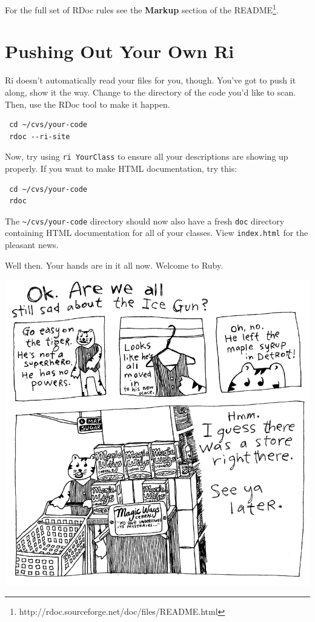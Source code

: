 \documentclass[10pt,twoside]{report}
\begin{document}
For the full set of RDoc rules see the \textbf{Markup} section of the
README\footnote{http://rdoc.sourceforge.net/doc/files/README.html}.

\section{Pushing Out Your Own Ri}

Ri doesn't automatically read your files for you, though. You've got
to push it along, show it the way. Change to the directory of the code
you'd like to scan. Then, use the RDoc tool to make it happen.

\begin{lstlisting}
 cd ~/cvs/your-code
 rdoc --ri-site
\end{lstlisting}

Now, try using \lstinline[breaklines=false]|ri YourClass| to ensure
all your descriptions are showing up properly. If you want to make
HTML documentation, try this:

\begin{lstlisting}
 cd ~/cvs/your-code
 rdoc
\end{lstlisting}

The \lstinline[breaklines=false]|~/cvs/your-code| directory should now
also have a fresh \lstinline[breaklines=false]|doc| directory
containing HTML documentation for all of your classes. View
\lstinline[breaklines=false]|index.html| for the pleasant news.

Well then. Your hands are in it all now. Welcome to Ruby.

\vfill
\newpage

\includegraphics[width=1.0\textwidth]{cache/tigersvest4.png} 

\newpage
\thispagestyle{empty}
\mbox{}
\newpage
\thispagestyle{empty}
\begin{center}
\vspace*{2.7in}
\manrotatedquadrifolium
\end{center}
\end{document}

